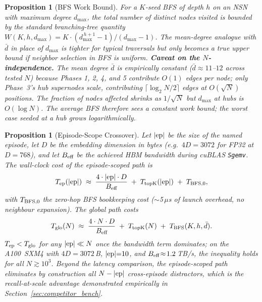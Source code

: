 \documentclass[11pt]{article}
\newtheorem{proposition}[theorem]{Proposition}
\begin{document}
\begin{proposition}[BFS Work Bound]
\label{prop:bfs}
For a $K$-seed BFS of depth $h$ on an NSN with maximum degree
$d_{\max}$, the total number of distinct nodes visited is bounded by
the standard branching-tree quantity
$W(K, h, d_{\max}) = K \cdot (d_{\max}^{\,h+1} - 1) / (d_{\max} - 1)$.
The mean-degree analogue with $\bar{d}$ in place of $d_{\max}$ is
tighter for typical traversals but only becomes a true upper bound if
neighbor selection in BFS is uniform.
\textbf{Caveat on the $N$-independence.} The mean degree $\bar{d}$ is
empirically constant ($\bar{d} \approx 11$--$12$ across tested $N$)
because Phases 1, 2, 4, and 5 contribute $O(1)$ edges per node; only
Phase~3's hub supernodes scale, contributing $\lceil\log_2 N / 2 \rceil$
edges at $O(\sqrt{N})$ positions. The fraction of nodes affected
shrinks as $1/\sqrt{N}$ but $d_{\max}$ at hubs is $O(\log N)$. The
average BFS therefore sees a constant work bound; the worst case
seeded at a hub grows logarithmically.
\end{proposition}

\begin{proposition}[Episode-Scope Crossover]
\label{prop:scope_crossover}
Let $|\textnormal{ep}|$ be the size of the named episode, let $D$ be
the embedding dimension in bytes (e.g.\ $4D{=}3072$ for FP32 at
$D{=}768$), and let $B_{\textnormal{eff}}$ be the achieved HBM
bandwidth during cuBLAS \texttt{Sgemv}. The wall-clock cost of the
episode-scoped path is
\[
T_{\textnormal{ep}}(|\textnormal{ep}|) \;\approx\;
\frac{4 \cdot |\textnormal{ep}| \cdot D}{B_{\textnormal{eff}}}
\;+\; T_{\textnormal{topK}}(|\textnormal{ep}|) \;+\; T_{\textnormal{BFS,0}},
\]
with $T_{\textnormal{BFS,0}}$ the zero-hop BFS bookkeeping cost
($\sim$5\,$\mu$s of launch overhead, no neighbour expansion). The
global path costs
\[
T_{\textnormal{glo}}(N) \;\approx\;
\frac{4 \cdot N \cdot D}{B_{\textnormal{eff}}}
\;+\; T_{\textnormal{topK}}(N) \;+\; T_{\textnormal{BFS}}(K, h, \bar{d}).
\]
$T_{\textnormal{ep}} < T_{\textnormal{glo}}$ for any
$|\textnormal{ep}| \ll N$ once the bandwidth term dominates; on the
A100~SXM4 with $4D{=}3072$\,B, $|\textnormal{ep}|{=}10$, and
$B_{\textnormal{eff}}\!\approx\!1.2$\,TB/s, the inequality holds for
all $N \gtrsim 10^3$. Beyond the latency comparison, the
episode-scoped path \emph{eliminates by construction} all
$N - |\textnormal{ep}|$ cross-episode distractors, which is the
recall-at-scale advantage demonstrated empirically in
Section~\ref{sec:competitor_bench}.
\end{proposition}
\end{document}
